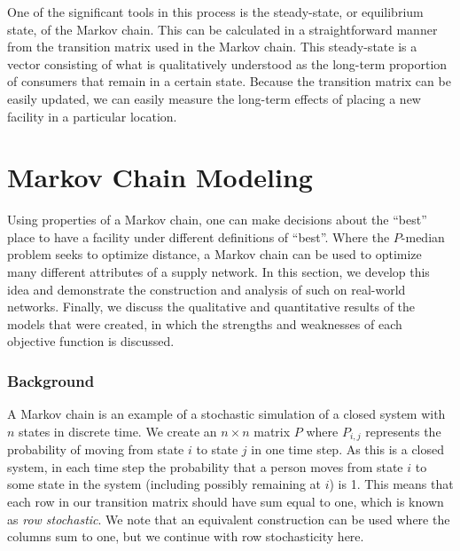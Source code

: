 \documentclass[twoside,twocolumn]{article}
\begin{document}
One of the significant tools in this process is the steady-state, or equilibrium state, of the Markov chain.
This can be calculated in a straightforward manner from the transition matrix used in the Markov chain.
This steady-state is a vector consisting of what is qualitatively understood as the long-term proportion of consumers that remain in a certain state. %
Because the transition matrix can be easily updated, we can easily measure the long-term effects of placing a new facility in a particular location.

\section{Markov Chain Modeling}

Using properties of a Markov chain, one can make decisions about the ``best'' place to have a facility under different definitions of ``best''.
Where the $P$-median problem seeks to optimize distance, a Markov chain can be used to optimize many different attributes of a supply network.
In this section, we develop this idea and demonstrate the construction and analysis of such on real-world networks.
Finally, we discuss the qualitative and quantitative results of the models that were created, in which the strengths and weaknesses of each objective function is discussed.

\subsubsection{Background}

A Markov chain is an example of a stochastic simulation of a closed system with $n$ states in discrete time.
We create an $n\times n$ matrix $P$ where $P_{i,j}$ represents the probability of moving from state $i$ to state $j$ in one time step.
As this is a closed system, in each time step the probability that a person moves from state $i$ to some state in the system (including possibly remaining at $i$) is 1. 
This means that each row in our transition matrix should have sum equal to one, which is known as {\em row stochastic}.
We note that an equivalent construction can be used where the columns sum to one, but we continue with row stochasticity here.%
\end{document}
